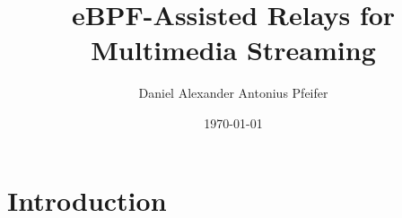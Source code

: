 \documentclass[shortpres,aspectratio=43]{beamer}
\title[Title]{eBPF-Assisted Relays for Multimedia Streaming}
\author[Name]{Daniel Alexander Antonius Pfeifer}
\institute[TU M\"unchen]{Technical University of Munich}
\date\today
\begin{document}


\begin{frame}[plain]
    \titlepage%
\end{frame}

\begin{frame}{}
  \tableofcontents
\end{frame}

\section{Introduction}

\begin{frame}{}
  \tableofcontents[currentsection]
\end{frame}
\end{document}

